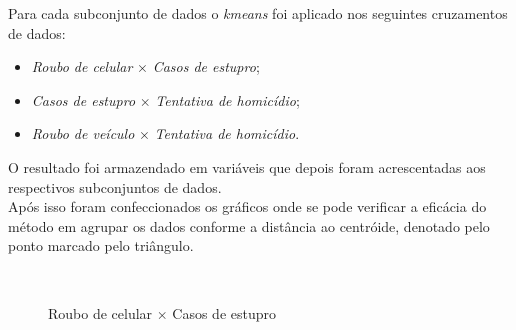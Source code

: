 \documentclass[a4paper, 12pt]{article}\usepackage[]{graphicx}\usepackage[]{color}
\begin{document}
  \begin{multicols}{2}
		Para cada subconjunto de dados o \textit{kmeans} foi aplicado nos seguintes cruzamentos de dados:
			\begin{itemize}
				\item \textit{Roubo de celular} $\times$ \textit{Casos de estupro};
				\item \textit{Casos de estupro} $\times$ \textit{Tentativa de homicídio};
				\item \textit{Roubo de veículo} $\times$ \textit{Tentativa de homicídio}.
			\end{itemize}
		O resultado foi armazendado em variáveis que depois foram acrescentadas aos respectivos subconjuntos de dados. \\
		
		Após isso foram confeccionados os gráficos onde se pode verificar a eficácia do método em agrupar os dados conforme a distância ao centróide, denotado pelo ponto marcado pelo triângulo.\\
	\end{multicols}		
	
	\begin{figure}[H]
		\centering
			~
			\caption{Roubo de celular $\times$ Casos de estupro}
			\label{fig:celEst}
	\end{figure}
	
\end{document}
